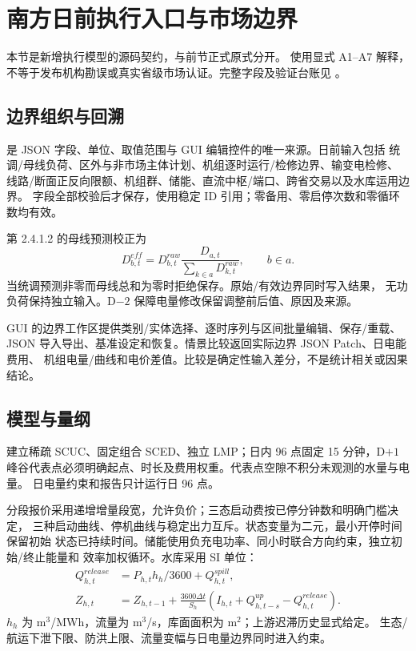 \section{南方日前执行入口与市场边界}\label{sec:southern-execution}

\begin{theorynote}
本节是新增执行模型的源码契约，与前节正式原式分开。
 使用显式 A1--A7 解释，
不等于发布机构勘误或真实省级市场认证。完整字段及验证台账见
。
\end{theorynote}

\subsection{边界组织与回溯}
是 JSON 字段、单位、取值范围与 GUI 编辑控件的唯一来源。日前输入包括
统调/母线负荷、区外与非市场主体计划、机组逐时运行/检修边界、输变电检修、
线路/断面正反向限额、机组群、储能、直流中枢/端口、跨省交易以及水库运用边界。
字段全部校验后才保存，使用稳定 ID 引用；零备用、零启停次数和零循环数均有效。

第 2.4.1.2 的母线预测校正为
\begin{equation}
 D^{eff}_{b,t}=D^{raw}_{b,t}\frac{D_{a,t}}{\sum_{k\in a}D^{raw}_{k,t}},
 \qquad b\in a.
\end{equation}
当统调预测非零而母线总和为零时拒绝保存。原始/有效边界同时写入结果，
无功负荷保持独立输入。D$-2$ 保障电量修改保留调整前后值、原因及来源。

GUI 的边界工作区提供类别/实体选择、逐时序列与区间批量编辑、保存/重载、JSON
导入导出、基准设定和恢复。情景比较返回实际边界 JSON Patch、日电能费用、
机组电量/曲线和电价差值。比较是确定性输入差分，不是统计相关或因果结论。

\subsection{模型与量纲}
建立稀疏 SCUC、固定组合 SCED、独立 LMP；日内 96 点固定 15 分钟，D$+1$
峰谷代表点必须明确起点、时长及费用权重。代表点空隙不积分未观测的水量与电量。
日电量约束和报告只计运行日 96 点。

分段报价采用递增增量段宽，允许负价；三态启动费按已停分钟数和明确门槛决定，
三种启动曲线、停机曲线与稳定出力互斥。状态变量为二元，最小开停时间保留初始
状态已持续时间。储能使用负充电功率、同小时联合方向约束，独立初始/终止能量和
效率加权循环。水库采用 SI 单位：
\begin{align}
 Q^{release}_{h,t}&=P_{h,t}h_h/3600+Q^{spill}_{h,t},\\
 Z_{h,t}&=Z_{h,t-1}+\frac{3600\Delta t}{S_h}
 (I_{h,t}+Q^{up}_{h,t-s}-Q^{release}_{h,t}).
\end{align}
$h_h$ 为 m$^3$/MWh，流量为 m$^3$/s，库面面积为 m$^2$；上游迟滞历史显式给定。
生态/航运下泄下限、防洪上限、流量变幅与日电量边界同时进入约束。

